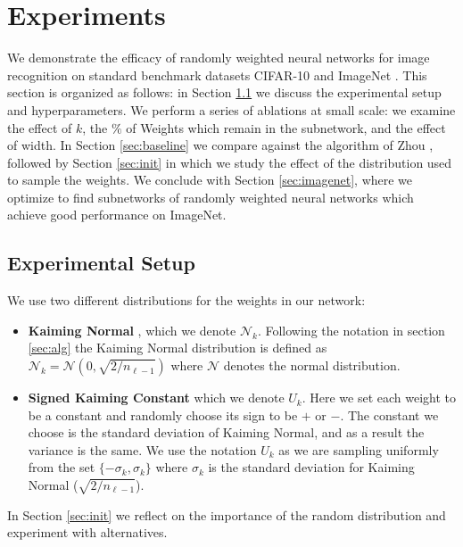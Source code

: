 \documentclass[10pt,twocolumn,letterpaper]{article}
\begin{document}
\section{Experiments}\label{sec:exp}

We demonstrate the efficacy of randomly weighted neural networks for image recognition on standard benchmark datasets CIFAR-10 \cite{cifar} and ImageNet \cite{imagenet}. This section is organized as follows: in Section \ref{sec:setup} we discuss the experimental setup and hyperparameters. We perform a series of ablations at small scale: we examine the effect of $k$, the $\%$ of Weights which remain in the subnetwork, and the effect of width. In Section \ref{sec:baseline} we compare against the algorithm of Zhou \etal, followed by Section \ref{sec:init} in which we study the effect of the distribution used to sample the weights. We conclude with Section \ref{sec:imagenet}, where we optimize to find subnetworks of randomly weighted neural networks which achieve good performance on ImageNet.

\subsection{Experimental Setup} \label{sec:setup}

We use two different distributions for the weights in our network:
\begin{itemize}
    \item \textbf{Kaiming Normal} \cite{kaiming-init}, which we denote $\mathcal{N}_k$. Following the notation in section \ref{sec:alg}  the Kaiming Normal distribution is defined as $\mathcal{N}_k = \mathcal{N}\left(0, \sqrt{2/n_{\ell -1}} \right)$ where $\mathcal{N}$ denotes the normal distribution.
    \item \textbf{Signed Kaiming Constant} which we denote $U_k$. Here we set each weight to be a constant and randomly choose its sign to be $+$ or $-$. The constant we choose is the standard deviation of Kaiming Normal, and as a result the variance is the same. We use the notation $U_k$ as we are sampling uniformly from the set $\{-\sigma_k, \sigma_k\}$ where $\sigma_k$ is the standard deviation for Kaiming Normal (\ie $\sqrt{2/n_{\ell -1}}$).
\end{itemize}
In Section \ref{sec:init} we reflect on the importance of the random distribution and experiment with alternatives.
\end{document}
